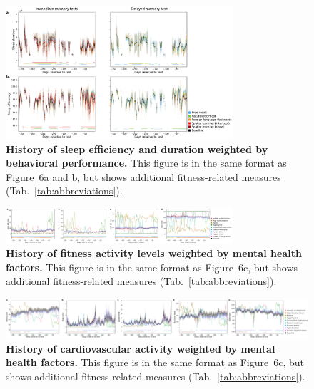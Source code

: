 \documentclass[10pt]{article}
\newcommand{\dynamics}{6}
\begin{document}
\begin{figure}[p]
  \centering
  \includegraphics[width=0.75\textwidth]{figs/weighted_timecourse_sleep}
\caption{\textbf{History of sleep efficiency and duration weighted by
    behavioral performance.}  This figure is in the same format as
  Figure~\dynamics a and b, but shows additional fitness-related measures (Tab.~\ref{tab:abbreviations}).}
\label{fig:sleep_timecourse}
\end{figure}

\begin{figure}
  \centering
  \includegraphics[width=0.75\textwidth]{figs/weighted_timecourse_activity_MH}
\caption{\textbf{History of fitness activity levels weighted by
    mental health factors.}  This figure is in the same format as
  Figure~\dynamics c, but shows additional fitness-related measures (Tab.~\ref{tab:abbreviations}).}
\label{fig:activity_timecourse_MH}
\end{figure}

\begin{figure}
  \centering
  \includegraphics[width=\textwidth]{figs/weighted_timecourse_HR_MH}
\caption{\textbf{History of cardiovascular activity weighted by
    mental health factors.} This figure is in the same format as
  Figure~\dynamics c, but shows additional fitness-related measures (Tab.~\ref{tab:abbreviations}).}
\label{fig:HR_timecourse_MH}
  \end{figure}
\end{document}
